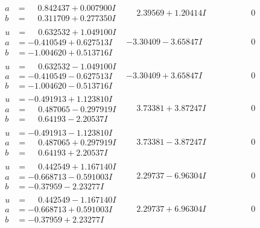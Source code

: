 \documentclass[1p]{elsarticle_modified}
\theoremstyle{definition}
\begin{document}
$$\begin{array}{c|c|c}
\begin{aligned}
a &= \phantom{-}0.842437 + 0.007900 I \\
b &= \phantom{-}0.311709 + 0.277350 I\end{aligned}
 & \phantom{-}2.39569 + 1.20414 I & \phantom{-0.000000 } 0 \\ \hline\begin{aligned}
u &= \phantom{-}0.632532 + 1.049100 I \\
a &= -0.410549 + 0.627513 I \\
b &= -1.004620 + 0.513716 I\end{aligned}
 & -3.30409 - 3.65847 I & \phantom{-0.000000 } 0 \\ \hline\begin{aligned}
u &= \phantom{-}0.632532 - 1.049100 I \\
a &= -0.410549 - 0.627513 I \\
b &= -1.004620 - 0.513716 I\end{aligned}
 & -3.30409 + 3.65847 I & \phantom{-0.000000 } 0 \\ \hline\begin{aligned}
u &= -0.491913 + 1.123810 I \\
a &= \phantom{-}0.487065 - 0.297919 I \\
b &= \phantom{-}0.64193 - 2.20537 I\end{aligned}
 & \phantom{-}3.73381 + 3.87247 I & \phantom{-0.000000 } 0 \\ \hline\begin{aligned}
u &= -0.491913 - 1.123810 I \\
a &= \phantom{-}0.487065 + 0.297919 I \\
b &= \phantom{-}0.64193 + 2.20537 I\end{aligned}
 & \phantom{-}3.73381 - 3.87247 I & \phantom{-0.000000 } 0 \\ \hline\begin{aligned}
u &= \phantom{-}0.442549 + 1.167140 I \\
a &= -0.668713 - 0.591003 I \\
b &= -0.37959 - 2.23277 I\end{aligned}
 & \phantom{-}2.29737 - 6.96304 I & \phantom{-0.000000 } 0 \\ \hline\begin{aligned}
u &= \phantom{-}0.442549 - 1.167140 I \\
a &= -0.668713 + 0.591003 I \\
b &= -0.37959 + 2.23277 I\end{aligned}
 & \phantom{-}2.29737 + 6.96304 I & \phantom{-0.000000 } 0\\

\end{array}$$
\end{document}
